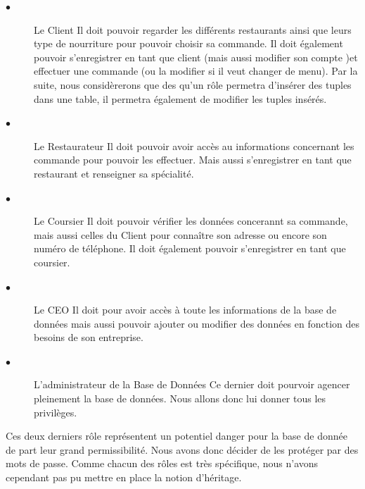 \documentclass[french]{article}
\begin{document}
                \begin{description}
                    \item[$\bullet$]Le Client\newline
                     Il doit pouvoir regarder les différents restaurants ainsi que leurs type de nourriture pour pouvoir choisir sa commande. Il doit également pouvoir s'enregistrer en tant que client (mais aussi modifier son compte )et effectuer une commande (ou la modifier si il veut changer de menu). Par la suite, nous considèrerons que des qu'un rôle permetra d'insérer des tuples dans une table, il permetra également de modifier les tuples insérés.

                    \item[$\bullet$]Le Restaurateur\newline
                     Il doit pouvoir avoir accès au informations concernant les commande pour pouvoir les effectuer. Mais aussi s'enregistrer en tant que restaurant et renseigner sa spécialité.

                    \item[$\bullet$]Le Coursier\newline
                     Il doit pouvoir vérifier les données concerannt sa commande, mais aussi celles du Client pour connaître son adresse ou encore son numéro de téléphone. Il doit également pouvoir s'enregistrer en tant que coursier.

                    \item[$\bullet$]Le CEO\newline
                     Il doit pour avoir accès à toute les informations de la base de données mais aussi pouvoir ajouter ou modifier des données en fonction des besoins de son entreprise. 

                    \item[$\bullet$]L'administrateur de la Base de Données\newline
                     Ce dernier doit pourvoir agencer pleinement la base de données. Nous allons donc lui donner tous les privilèges.  
                \end{description}

                Ces deux derniers rôle représentent un potentiel danger pour la base de donnée de part leur grand permissibilité. Nous avons donc décider de les protéger par des mots de passe.\newline
                Comme chacun des rôles est très spécifique, nous n'avons cependant pas pu mettre en place la notion d'héritage.
\end{document}
